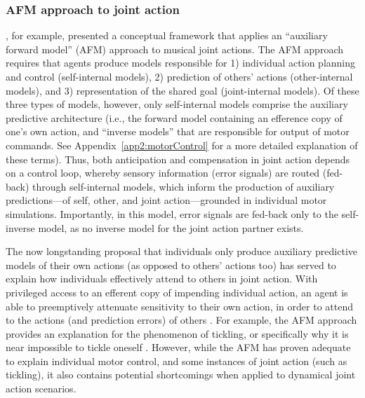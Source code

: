 \begin{CJK}{UTF8}{gbsn}
\subsubsection{AFM approach to joint action\label{app2:AFMapproachJA}}
 \textcite{Keller2016}, for example, presented a conceptual framework that applies an ``auxiliary forward model'' (AFM) approach to musical joint actions.  The AFM approach requires that agents produce models responsible for 1) individual action planning and control (self-internal models), 2) prediction of others' actions (other-internal models), and 3) representation of the shared goal (joint-internal models).  Of these three types of models, however, only self-internal models comprise the auxiliary predictive architecture (i.e., the forward model containing an efference copy of one's own action, and ``inverse models'' that are responsible for output of motor commands. See Appendix~\ref{app2:motorControl} for a more detailed explanation of these terms).  Thus, both anticipation and compensation in joint action depends on a control loop, whereby sensory information (error signals) are routed (fed-back) through self-internal models, which inform the production of auxiliary predictions---of self, other, and joint action---grounded in individual motor simulations.  Importantly, in this model,  error signals are fed-back only to the self-inverse model, as no inverse model for the joint action partner exists.

The now longstanding proposal that individuals only produce auxiliary predictive models of their own actions (as opposed to others' actions too) has served to explain how individuals effectively attend to others in joint action.  With privileged access to an efferent copy of impending individual action, an agent is able to preemptively attenuate sensitivity to their own action, in order to attend to the actions (and prediction errors) of others \citep{Wolpert1998}.  For example, the AFM approach provides an explanation for the phenomenon of tickling, or specifically why it is near impossible to tickle oneself \citep[due to sensory attenuation resulting from the self-generated predictions about the consequences of action][]{Blakemore2003}. However, while the AFM has proven adequate to explain individual motor control, and some instances of joint action (such as tickling), it also contains potential shortcomings when applied to dynamical joint action scenarios.


\end{CJK}
